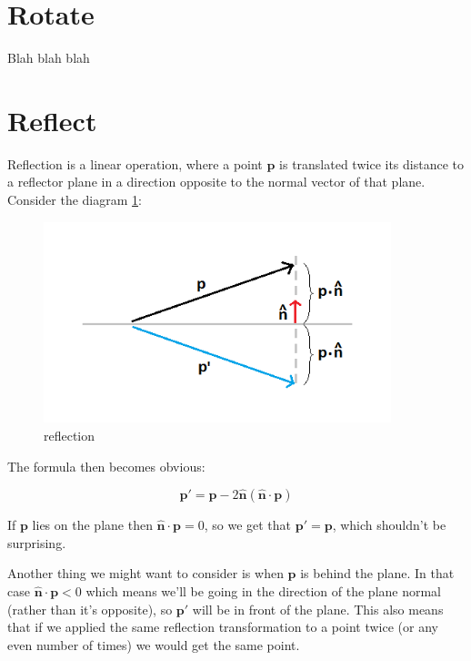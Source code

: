 \documentclass[]{report}   %
\begin{document}
\section{Rotate}

Blah blah blah


\section{Reflect}

Reflection is a linear operation, where a point \(\mathbf{p}\) is translated twice its distance to a reflector plane in a direction opposite to the normal vector of that plane. Consider the diagram \ref{fig:reflect}:

\begin{figure}[htb]
\centering
\includegraphics[width=0.9\textwidth]{reflection-diagram}
\caption{reflection}
\label{fig:reflect}
\end{figure}

The formula then becomes obvious:
\begin{mdframed}
\[
	\mathbf{p\prime} = 
	\mathbf{p} - 2\mathbf{\hat{n}}(\mathbf{\hat{n}} \cdot \mathbf{p})
\]
\end{mdframed}

If \(\mathbf{p}\) lies on the plane then \(\mathbf{\hat{n}} \cdot \mathbf{p} = 0\), so we get that \(\mathbf{p\prime} = \mathbf{p}\), which shouldn't be surprising. 

Another thing we might want to consider is when \(\mathbf{p}\) is behind the plane. In that case \(\mathbf{\hat{n}} \cdot \mathbf{p} < 0\) which means we'll be going in the direction of the plane normal (rather than it's opposite), so \(\mathbf{p\prime}\) will be in front of the plane. This also means that if we applied the same reflection transformation to a point twice (or any even number of times) we would get the same point.
\end{document}

